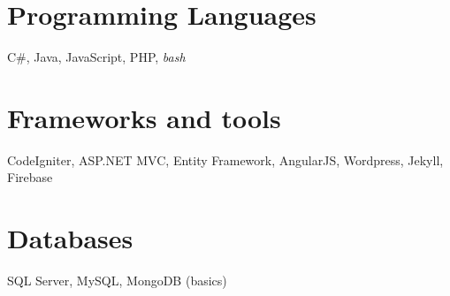 \documentclass[margin,line]{resume}
\begin{document}
\begin{resume}
    \section{\mysidestyle Programming Languages} 
    C\#, Java, JavaScript, PHP, \textsl{bash}
    
    \section{\mysidestyle Frameworks and tools} 
    CodeIgniter, ASP.NET MVC, Entity Framework, AngularJS, Wordpress, Jekyll, Firebase

    \section{\mysidestyle Databases} 
    SQL Server, MySQL, MongoDB (basics)
    


\end{resume}
\end{document}

